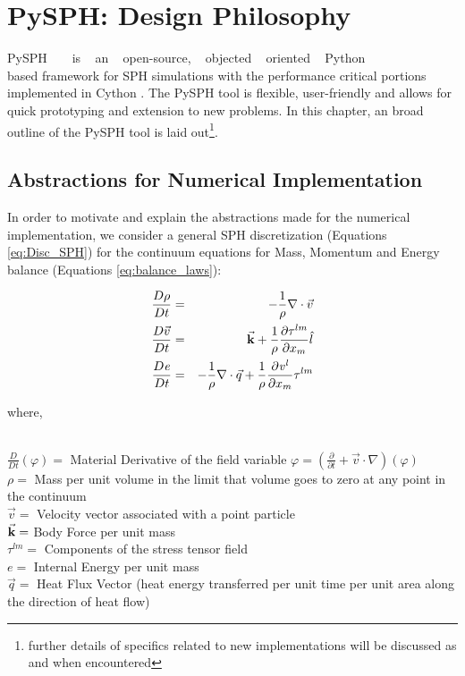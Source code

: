 \chapter{PySPH: Design Philosophy}

PySPH ~\cite{prabhu_puri} ~ is ~ an ~ open-source, ~ objected ~ oriented ~ Python\\ \cite{python} based framework for SPH simulations with the performance critical portions implemented in Cython \cite{cython}. The PySPH tool is flexible, user-friendly and allows for quick prototyping and extension to new problems. In this chapter, an broad outline of the PySPH tool is laid out\footnote[3]{further details of specifics related to new implementations will be discussed as and when encountered}.

\section{Abstractions for Numerical Implementation} \label{sec:pysph_abstractions}

In order to motivate and explain the abstractions made for the numerical implementation, we consider a general SPH discretization (Equations \eqref{eq:Disc_SPH}) for the continuum equations for Mass, Momentum and Energy balance (Equations \eqref{eq:balance_laws}):

\begin{eqnarray} \label{eq:balance_laws}
\frac{D\rho}{Dt} &=& -\frac{1}{\rho} \nabla \cdot \vec{v} \nonumber \\
\frac{D{\vec{v}}}{Dt}&=&\vec{{\bf{k}}} + \frac{1}{\rho} \frac{\partial \tau^{lm}}{\partial x_m} \hat{l} \\
\frac{D{\it{e}}}{Dt}&=& -\frac{1}{\rho}\nabla \cdot \vec{q} + \frac{1}{\rho}\frac{\partial {\it{v}^{l}} }{\partial x_m}\tau^{lm} \nonumber
\end{eqnarray}

{\raggedright{where,}}\\
$\frac{D}{Dt}(\varphi) = $ Material Derivative of the field variable $\varphi = \left(\frac{\partial}{\partial t} + \vec{v}\cdot\nabla\right)(\varphi)$ \\
$\rho = $ Mass per unit volume in the limit that volume goes to zero at any point in the continuum\\
$\vec{v} = $ Velocity vector associated with a point particle\\
$\vec{{\bf{k}}} = $ Body Force per unit mass\\
$\tau^{lm} = $ Components of the stress tensor field\\
$e = $ Internal Energy per unit mass\\
$\vec{q} = $ Heat Flux Vector (heat energy transferred per unit time per unit area along the direction of heat flow) 

